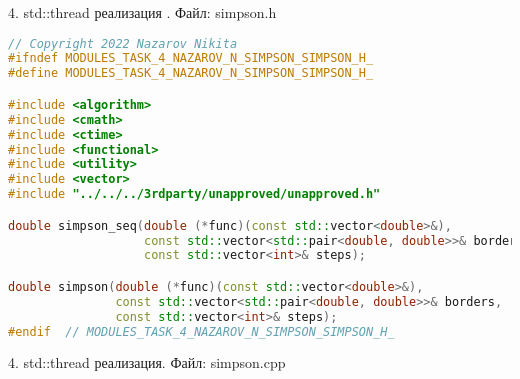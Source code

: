 \documentclass{report}
\begin{document}
\par 4. std::thread реализация . Файл: simpson.h

\begin{lstlisting}[language=C++]
// Copyright 2022 Nazarov Nikita
#ifndef MODULES_TASK_4_NAZAROV_N_SIMPSON_SIMPSON_H_
#define MODULES_TASK_4_NAZAROV_N_SIMPSON_SIMPSON_H_

#include <algorithm>
#include <cmath>
#include <ctime>
#include <functional>
#include <utility>
#include <vector>
#include "../../../3rdparty/unapproved/unapproved.h"

double simpson_seq(double (*func)(const std::vector<double>&),
                   const std::vector<std::pair<double, double>>& borders,
                   const std::vector<int>& steps);

double simpson(double (*func)(const std::vector<double>&),
               const std::vector<std::pair<double, double>>& borders,
               const std::vector<int>& steps);
#endif  // MODULES_TASK_4_NAZAROV_N_SIMPSON_SIMPSON_H_
\end{lstlisting}

\par 4. std::thread реализация. Файл: simpson.cpp
\end{document}
